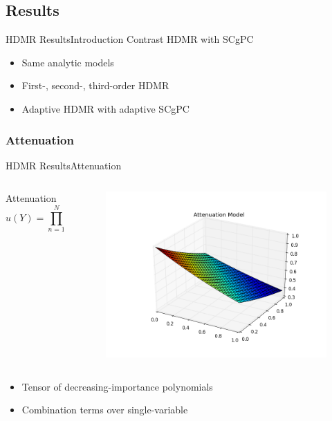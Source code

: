 \documentclass{beamer}
\begin{document}
\subsection{Results}
\begin{frame}{HDMR Results}{Introduction}\vspace{-20pt}
  \vfill
  Contrast HDMR with SCgPC
  \vfill
  \begin{itemize}
    \item Same analytic models
  \vfill
    \item First-, second-, third-order HDMR
  \vfill
    \item Adaptive HDMR with adaptive SCgPC
  \end{itemize}
  \vfill
\end{frame}

\subsubsection{Attenuation}
\begin{frame}{HDMR Results}{Attenuation}\vspace{-20pt}
  \begin{columns}
    \begin{column}{0.6\textwidth}
      \begin{block}{Attenuation}
        \[u(Y) = \prod_{n=1}^N \exp(-y_n/N)\]
      \end{block}
    \end{column}
    \begin{column}{0.4\textwidth}
        \begin{figure}[h!]
          \centering
          \includegraphics[width=\linewidth]{anlmodels/attenuate}
        \end{figure}
    \end{column}
  \end{columns}
  \begin{itemize}
    \item Tensor of decreasing-importance polynomials
    \item Combination terms over single-variable
  \end{itemize}
\end{frame}
\end{document}
